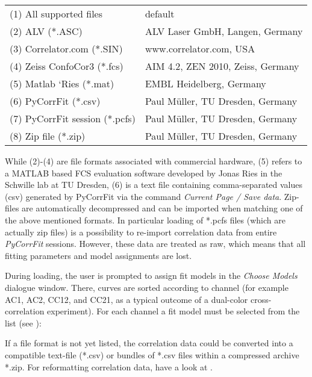 \begin{tabular}{l l}
 \rule{0pt}{3ex}  (1) All supported files & default \\

 \rule{0pt}{3ex} (2) ALV (*.ASC) & ALV Laser GmbH, Langen, Germany \\

 \rule{0pt}{3ex} (3) Correlator.com (*.SIN) & www.correlator.com, USA \\

 \rule{0pt}{3ex} (4) Zeiss ConfoCor3 (*.fcs) & AIM 4.2, ZEN 2010, Zeiss, Germany \\
 
 \rule{0pt}{3ex} (5) Matlab ‘Ries (*.mat) & EMBL Heidelberg, Germany \\

 \rule{0pt}{3ex} (6) PyCorrFit (*.csv) & Paul Müller, TU Dresden, Germany \\

 \rule{0pt}{3ex} (7) PyCorrFit session (*.pcfs) & Paul Müller, TU Dresden, Germany \\


 \rule{0pt}{3ex} (8) Zip file (*.zip) & Paul Müller, TU Dresden, Germany \\
\end{tabular}
\vspace{3ex}
\newline
While (2)-(4) are file formats associated with commercial hardware, (5) refers to a MATLAB based FCS evaluation software developed by Jonas Ries in the Schwille lab at TU Dresden, (6) is a text file containing comma-separated values (csv) generated by PyCorrFit via the command \textit{Current Page / Save data}. Zip-files are automatically decompressed and can be imported when matching one of the above mentioned formats. In particular loading of *.pcfs files (which are actually zip files) is a possibility to re-import correlation data from entire \textit{PyCorrFit} sessions. However, these data are treated as raw, which means that all fitting parameters and model assignments are lost.

During loading, the user is prompted to assign fit models in the \textit{Choose Models} dialogue window. There, curves are sorted according to channel (for example AC1, AC2, CC12, and CC21, as a typical outcome of a dual-color cross-correlation experiment). For each channel a fit model must be selected from the list (see ):

If a file format is not yet listed, the correlation data could be converted into a compatible text-file (*.csv) or bundles of *.csv files within a compressed archive *.zip. For reformatting correlation data, have a look at .

